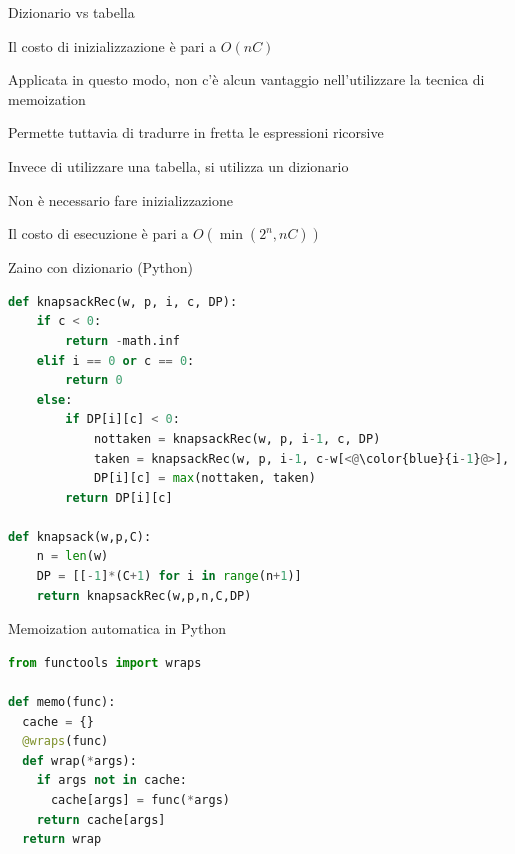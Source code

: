 \begin{frame}{Dizionario vs tabella}

\vspace{-9pt}
  \BIL
  \item Il costo di inizializzazione è pari a $O(nC)$
  \item Applicata in questo modo, non c'è alcun vantaggio nell'utilizzare
  la tecnica di memoization
  \item Permette tuttavia di tradurre in fretta le espressioni ricorsive
  \EIL

\pause
{}
  \BIL
  \item Invece di utilizzare una tabella, si utilizza un dizionario
  \item Non è necessario fare inizializzazione
  \item Il costo di esecuzione è pari a $O(\min(2^n,nC))$
  \EIL

\end{frame}

\begin{frame}[fragile,shrink=5]{Zaino con dizionario (Python)}

\vspace{-9pt}
\begin{lstlisting}[language=python,tabsize=2]
def knapsackRec(w, p, i, c, DP):
	if c < 0:
		return -math.inf
	elif i == 0 or c == 0:
		return 0
	else:
		if DP[i][c] < 0:
			nottaken = knapsackRec(w, p, i-1, c, DP)
			taken = knapsackRec(w, p, i-1, c-w[<@\color{blue}{i-1}@>], DP) + p[<@\color{blue}{i-1}@>]
			DP[i][c] = max(nottaken, taken)
		return DP[i][c]

def knapsack(w,p,C):
	n = len(w)
	DP = [[-1]*(C+1) for i in range(n+1)]
	return knapsackRec(w,p,n,C,DP)
\end{lstlisting}

\end{frame}

\begin{frame}[fragile]{Memoization automatica in Python}

\vspace{-9pt}
\begin{lstlisting}[language=python]
from functools import wraps

def memo(func):
  cache = {}
  @wraps(func)
  def wrap(*args):
    if args not in cache:
      cache[args] = func(*args)
    return cache[args]
  return wrap
\end{lstlisting}


\end{frame}

